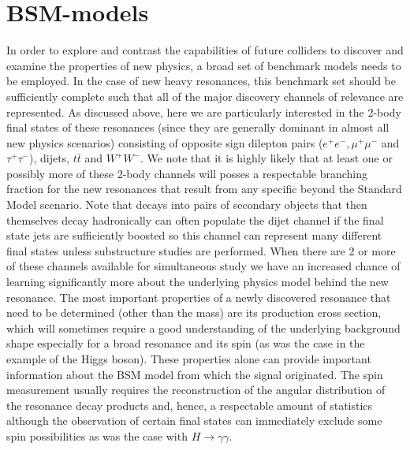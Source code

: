 \section{BSM-models}
\label{sec:physmodel}


In order to explore and contrast the capabilities of future colliders to discover and examine the properties of new physics, a broad set of benchmark models needs to be employed. In the 
case of new heavy resonances, this benchmark set should be sufficiently complete such that all of the major discovery channels of relevance are represented. As discussed above, here we 
are particularly interested in the 2-body final states of these resonances (since they are generally dominant in almost all new physics scenarios) consisting of opposite sign dilepton 
pairs ($e^+e^-, \mu^+\mu^-$ and $\tau^+\tau^-$), dijets, $ t\bar t$ and $W^+W^-$.  We note that it is highly likely that at least one or possibly more of these 2-body channels will posses 
a respectable branching fraction for the new resonances that result from any specific beyond the Standard Model scenario. Note that decays into pairs of secondary objects that 
then themselves decay hadronically can often populate the dijet channel if the final state jets are sufficiently boosted so this channel can represent many different final states unless 
substructure studies are performed.  When there are 2 or more of these channels available for simultaneous study we have an increased chance of learning significantly more about 
the underlying physics model behind the new resonance. The most important properties of a newly discovered resonance that need to be determined (other than the mass) are its 
production cross section, which will sometimes require a good understanding of the underlying background shape especially for a broad resonance and its spin (as was the case in 
the example of the Higgs boson). These properties alone can provide important information about the BSM model from which the signal originated. The spin measurement usually requires 
the reconstruction of the angular distribution of the resonance decay products and, hence, a respectable amount of statistics although the observation of certain final states can 
immediately exclude some spin possibilities as was the case with $H\rightarrow \gamma \gamma$.

